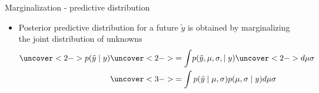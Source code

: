 \documentclass[finnish,english,t]{beamer}
\begin{document}
\begin{frame}{Marginalization - predictive distribution}

  \begin{itemize}
  \item Posterior predictive distribution for a future $\tilde{y}$ is
    obtained by marginalizing the joint distribution of unknowns
      \begin{align*}
        \uncover<2->{p(\tilde{y} \mid y)}  & \uncover<2->{= \int} p(\tilde{y}, \mu, \sigma, \mid y) \uncover<2->{d\mu\sigma}\\
                             & \uncover<3->{= \int p(\tilde{y} \mid \mu, \sigma)p(\mu, \sigma \mid y) d\mu\sigma}
      \end{align*}
    \end{itemize}

\end{frame}


  
\end{document}
